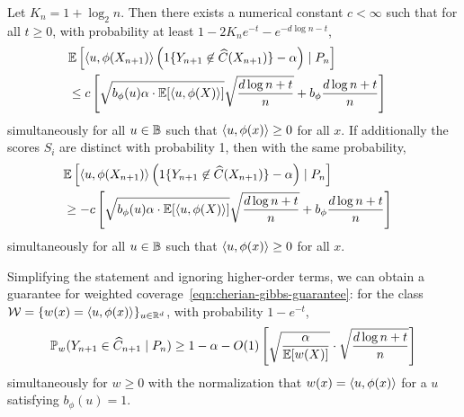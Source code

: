 \documentclass{article}
\newcommand{\radphi}{b_{\phi}}
\newcommand{\scorerv}{S}
\begin{document}
\begin{theorem}
  \label{theorem:one-sided-sharp}
  Let $K_n = 1 + \log_2 n$.
  Then there exists a numerical constant $c < \infty$ such that
  for all $t \ge 0$,
  with probability at least $1 - 2 K_n e^{-t} - e^{-d \log n - t}$,
  \begin{align*}
    \lefteqn{\E\left[\<u, \phi(X_{n+1})\>
      \left(\indics{Y_{n + 1} \not \in \what{C}(X_{n+1})}
      - \alpha\right)
      \mid P_n \right]} \\
    & \le c \left[\sqrt{\radphi(u) \alpha \cdot \E[\<u, \phi(X)\>]}
      \sqrt{\frac{d \log n + t}{n}}
      + \radphi \frac{d \log n + t}{n}\right]
  \end{align*}
  simultaneously for all $u \in \mathbb{B}$ such that
  $\langle u, \phi(x)\rangle \ge 0$ for all $x$.
  If additionally the scores $\scorerv_i$ are distinct
  with probability 1, then with the same probability,
  \begin{align*}
    \lefteqn{\E\left[\<u, \phi(X_{n+1})\>
      \left(\indics{Y_{n + 1} \not \in \what{C}(X_{n+1})}
      - \alpha\right)
      \mid P_n \right]} \\
    & \ge - c \left[\sqrt{\radphi(u) \alpha \cdot \E[\<u, \phi(X)\>]}
      \sqrt{\frac{d \log n + t}{n}}
      + \radphi \frac{d \log n + t}{n}\right]
  \end{align*}
  simultaneously for all $u \in \mathbb{B}$ such that
  $\langle u, \phi(x)\rangle \ge 0$ for all $x$.
\end{theorem}
\noindent
Simplifying the statement and ignoring higher-order terms, we can obtain a
guarantee for weighted coverage~\eqref{eqn:cherian-gibbs-guarantee}: for the
class $\mathcal{W} = \{w(x) = \langle u, \phi(x)\rangle\}_{u \in \mathbb{R}^d}$, with probability $1
- e^{-t}$,
\begin{equation*}
  \mathbb{P}_w(Y_{n + 1} \in \widehat{C}_{n + 1} \mid P_n)
  \ge 1 - \alpha - O(1) \left[\sqrt{\frac{\alpha}{\mathbb{E}[w(X)]}}
    \cdot \sqrt{\frac{d \log n + t}{n}}\right]
\end{equation*}
simultaneously for $w \ge 0$
with the normalization that $w(x) = \langle u, \phi(x)\rangle$ for
a $u$ satisfying $\radphi(u) = 1$.
\end{document}
